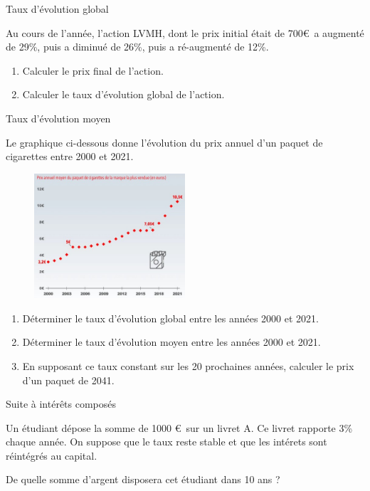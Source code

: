 \documentclass[a4paper]{article}
\begin{document}
\vspace{0.4cm}
 \exost Taux d'évolution global

 Au cours de l’année, l’action LVMH, dont le prix initial était de 700\euro\, a augmenté de 29\%, puis a diminué de 26\%, puis a ré-augmenté de 12\%.

\begin{enumerate}
    \item Calculer le prix final de l'action.

\vspace{0.2cm}

    \item Calculer le taux d'évolution global de l'action. 

\vspace{0.2cm}
\end{enumerate}


\vspace{0.4cm}
\exost Taux d'évolution moyen

Le graphique ci-dessous donne l’évolution du prix annuel d’un paquet de cigarettes entre 2000 et 2021.

\begin{figure}[h] 
  \centering
  \includegraphics[width=0.5\textwidth]{cigarettes.jpg} 
\end{figure}


\begin{enumerate}
    \item Déterminer le taux d'évolution global entre les années 2000 et 2021.
    \item Déterminer le taux d'évolution moyen entre les années 2000 et 2021.
    \item En supposant ce taux constant sur les 20 prochaines années, calculer le prix d'un paquet de 2041. 

\vspace{0.2cm}
\end{enumerate}


\vspace{0.5cm}
\exost Suite à intérêts composés 

Un étudiant dépose la somme de 1000 \euro\ sur un livret A. Ce livret rapporte 3\% chaque année. On suppose que le taux reste stable et que les intérets sont réintégrés au capital.

De quelle somme d'argent disposera cet étudiant dans 10 ans ?
\end{document}

